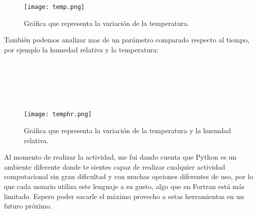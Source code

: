 \documentclass[12pt, spanish, letterpaper]{article}
\begin{document}
\begin{figure}[h]
    \centering
    \texttt{[image: temp.png]}
    \caption{Gráfica que representa la variación de la temperatura.}
    \label{fig:my_labe}
\end{figure}


También podemos analizar mas de un parámetro comparado respecto al tiempo, por ejemplo la humedad relativa y la temperatura:
\\
\\
\\
\\
\\
\\
\begin{figure}[!htb]
    \centering
    \texttt{[image: temphr.png]}
    \caption{Gráfica que representa la variación de la temperatura y la huemdad relativa.}
    \label{fig:my_label}
\end{figure}

Al momento de realizar la actividad, me fui dando cuenta que Python es un ambiente diferente donde te sientes capaz de realizar cualquier actividad computacional sin gran dificultad y con muchas opciones diferentes de uso, por lo que cada usuario utiliza este lenguaje a su gusto, algo que en Fortran está más limitado. Espero poder sacarle el máximo provecho a estas herramientas en un futuro próximo.



%
%
\end{document}
